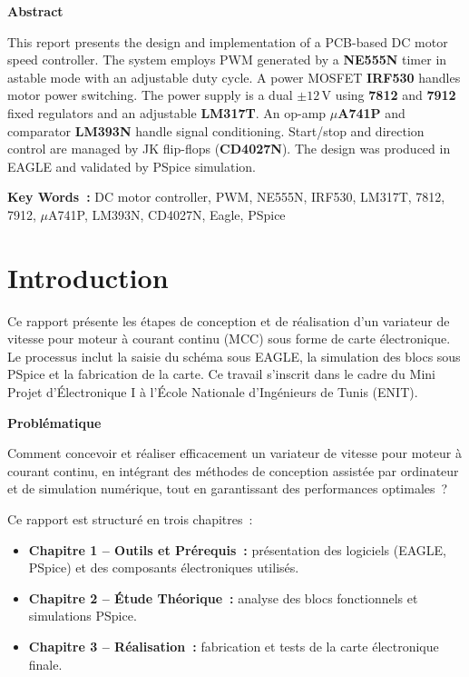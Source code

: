 \documentclass[a4paper,12pt,openany]{book}
\begin{document}
\vspace{2\baselineskip}
\centerline{\Large \textbf{Abstract}}
\vspace{\baselineskip}

This report presents the design and implementation of a PCB-based DC motor
speed controller. The system employs PWM generated by a \textbf{NE555N}
timer in astable mode with an adjustable duty cycle. A power MOSFET
\textbf{IRF530} handles motor power switching. The power supply is a dual
$\pm12$\,V using \textbf{7812} and \textbf{7912} fixed regulators and an
adjustable \textbf{LM317T}. An op-amp \textbf{$\mu$A741P} and comparator
\textbf{LM393N} handle signal conditioning. Start/stop and direction control
are managed by JK flip-flops (\textbf{CD4027N}). The design was produced in
EAGLE and validated by PSpice simulation.

\noindent \textbf{Key Words~:} DC motor controller, PWM, NE555N, IRF530,
LM317T, 7812, 7912, $\mu$A741P, LM393N, CD4027N, Eagle, PSpice

\tableofcontents
\newpage
{}
\listoffigures
\newpage
{}
\listoftables

\chapter*{Introduction}

Ce rapport pr\'esente les \'etapes de conception et de r\'ealisation d'un
variateur de vitesse pour moteur \`a courant continu (MCC) sous forme de
carte \'electronique. Le processus inclut la saisie du sch\'ema sous EAGLE,
la simulation des blocs sous PSpice et la fabrication de la carte. Ce
travail s'inscrit dans le cadre du Mini Projet d'\'Electronique I \`a
l'\'Ecole Nationale d'Ing\'enieurs de Tunis (ENIT).

\bigskip\noindent\textbf{Probl\'ematique}

Comment concevoir et r\'ealiser efficacement un variateur de vitesse pour
moteur \`a courant continu, en int\'egrant des m\'ethodes de conception
assist\'ee par ordinateur et de simulation num\'erique, tout en garantissant
des performances optimales~?

\bigskip
Ce rapport est structur\'e en trois chapitres~:
\begin{itemize}
  \item \textbf{Chapitre 1 -- Outils et Pr\'erequis~:} pr\'esentation des
        logiciels (EAGLE, PSpice) et des composants \'electroniques utilis\'es.
  \item \textbf{Chapitre 2 -- \'Etude Th\'eorique~:} analyse des blocs
        fonctionnels et simulations PSpice.
  \item \textbf{Chapitre 3 -- R\'ealisation~:} fabrication et tests de la
        carte \'electronique finale.
\end{itemize}
\end{document}
